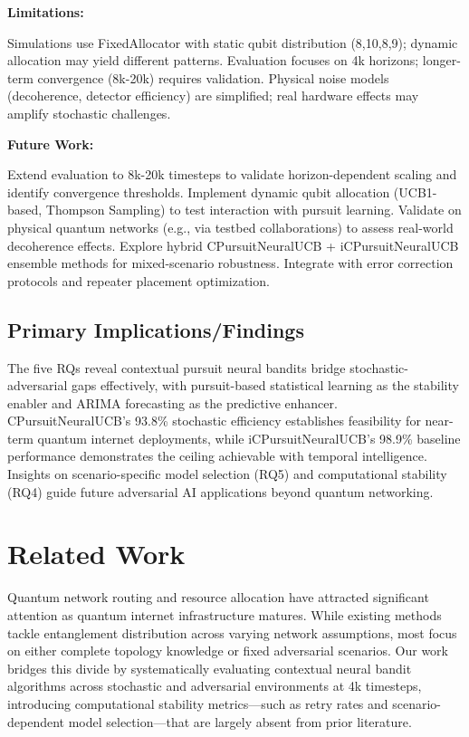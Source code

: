 \documentclass[sigconf,anonymous,review,natbib=false]{acmart}
\newcommand{\smallTitle}[1]{\vspace{1mm} \noindent \textbf{#1: }}
\begin{document}
\smallTitle{Limitations} 

Simulations use FixedAllocator with static qubit distribution (8,10,8,9); dynamic allocation may yield different patterns. Evaluation focuses on 4k horizons; longer-term convergence (8k-20k) requires validation. Physical noise models (decoherence, detector efficiency) are simplified; real hardware effects may amplify stochastic challenges.

\smallTitle{Future Work} 

Extend evaluation to 8k-20k timesteps to validate horizon-dependent scaling and identify convergence thresholds. Implement dynamic qubit allocation (UCB1-based, Thompson Sampling) to test interaction with pursuit learning. Validate on physical quantum networks (e.g., via testbed collaborations) to assess real-world decoherence effects. Explore hybrid CPursuitNeuralUCB + iCPursuitNeuralUCB ensemble methods for mixed-scenario robustness. Integrate with error correction protocols and repeater placement optimization.

\subsection{Primary Implications/Findings} 
\label{sec: PrimaryImplications}

The five RQs reveal contextual pursuit neural bandits bridge stochastic-adversarial gaps effectively, with pursuit-based statistical learning as the stability enabler and ARIMA forecasting as the predictive enhancer. CPursuitNeuralUCB's 93.8\% stochastic efficiency establishes feasibility for near-term quantum internet deployments, while iCPursuitNeuralUCB's 98.9\% baseline performance demonstrates the ceiling achievable with temporal intelligence. Insights on scenario-specific model selection (RQ5) and computational stability (RQ4) guide future adversarial AI applications beyond quantum networking.


\section{Related Work} 
\label{sec: RelatedWork}

Quantum network routing and resource allocation have attracted significant attention as quantum internet infrastructure matures. While existing methods tackle entanglement distribution across varying network assumptions, most focus on either complete topology knowledge or fixed adversarial scenarios. Our work bridges this divide by systematically evaluating contextual neural bandit algorithms across stochastic and adversarial environments at 4k timesteps, introducing computational stability metrics—such as retry rates and scenario-dependent model selection—that are largely absent from prior literature.
\end{document}
